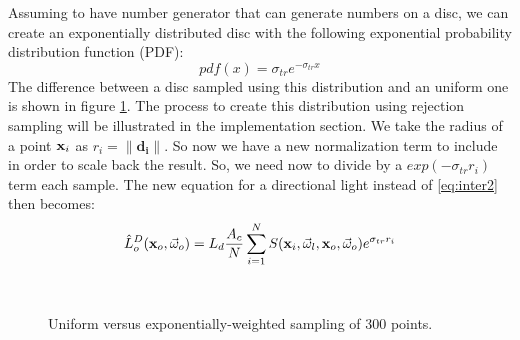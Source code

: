 Assuming to have number generator that can generate numbers on a disc, we can create an exponentially distributed disc with the following exponential probability distribution function (PDF):
$$
pdf(x) = \sigma_{tr} e^{-\sigma_{tr} x}
$$
The difference between a disc sampled using this distribution and an uniform one is shown in figure \ref{fig:samplingweight}. The process to create this distribution using rejection sampling will be illustrated in the implementation section. We take the radius of a point $\mathbf{x}_i$ as $r_i = \|\mathbf{d_i}\|$. So now we have a new normalization term to include in order to scale back the result. So, we need now to divide by a $exp(-\sigma_{tr} r_i)$ term each sample. The new equation for a directional light instead of \ref{eq:inter2} then becomes:
$$
\hat{L}_o^D(\mathbf{x}_o,\vec{\omega}_o) = L_d \frac{A_c}{N} \sum_{i = 1}^N S(\mathbf{x}_i, \vec{\omega}_l, \mathbf{x}_o, \vec{\omega}_o) e^{\sigma_{tr} r_i}
$$
\begin{figure}
\centering
{}
 \\
\caption{Uniform versus exponentially-weighted sampling of 300 points.}
\label{fig:samplingweight}
\end{figure}
